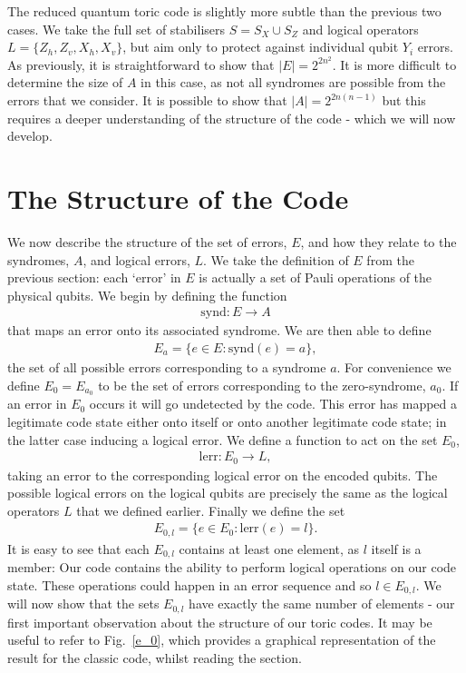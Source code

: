 The reduced quantum toric code is slightly more subtle than the previous two cases. We take the full set of stabilisers $S = S_X \cup S_Z$ and logical operators $L = \{Z_h, Z_v, X_h, X_v\}$, but aim only to protect against individual qubit $Y_i$ errors. As previously, it is straightforward to show that $|E| = 2^{2n^2}$. It is more difficult to determine the size of $A$ in this case, as not all syndromes are possible from the errors that we consider. It is possible to show that $|A| = 2^{2n(n-1)}$ but this requires a deeper understanding of the structure of the code - which we will now develop.

\section{The Structure of the Code}

We now describe the structure of the set of errors, $E$, and how they relate to the syndromes, $A$, and logical errors, $L$. We take the definition of $E$ from the previous section: each `error' in $E$ is actually a set of Pauli operations of the physical qubits. We begin by defining the function
\begin{align}
  \text{synd}: E \rightarrow A
\end{align}
that maps an error onto its associated syndrome. We are then able to define
\begin{align}
  E_a = \{ e\in E : \text{synd}(e) = a \},
\end{align}
the set of all possible errors corresponding to a syndrome $a$. For convenience we define $E_0 = E_{a_0}$ to be the set of errors corresponding to the zero-syndrome, $a_0$. If an error in $E_0$ occurs it will go undetected by the code. This error has mapped a legitimate code state either onto itself or onto another legitimate code state; in the latter case inducing a logical error. We define a function to act on the set $E_0$,
\begin{align}
  \text{lerr}: E_0 \rightarrow L,
\end{align}
taking an error to the corresponding logical error on the encoded qubits. The possible logical errors on the logical qubits are precisely the same as the logical operators $L$ that we defined earlier. Finally we define the set
\begin{align}
  E_{0, l} = \{ e\in E_0: \text{lerr}(e) = l \}.
\end{align}
It is easy to see that each $E_{0, l}$ contains at least one element, as $l$ itself is a member: Our code contains the ability to perform logical operations on our code state. These operations could happen in an error sequence and so $l \in E_{0,l}$. We will now show that the sets $E_{0,l}$ have exactly the same number of elements - our first important observation about the structure of our toric codes. It may be useful to refer to Fig.~\ref{e_0}, which provides a graphical representation of the result for the classic code, whilst reading the section.

